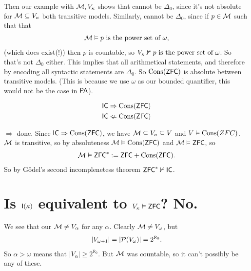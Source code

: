 \documentclass{article}
\begin{document}
Then our example with $\mathcal{M}, V_{\kappa}$ shows that  cannot be $\Delta_{0}$, since it's not absolute for $\mathcal{M} \subseteq V_{\kappa}$ both transitive models. \gap Similarly,  cannot be $\Delta_{0}$, since if $p \in \mathcal{M}$ such that that \[\mathcal{M} \vDash p \text{ is the power set of } \omega,\] (which does exist(!)) then $p$ is countable, so $V_{\kappa} \nvDash p \text{ is the power set of } \omega$. So that's not $\Delta_{0}$ either.  \gap 
This implies that all arithmetical statements, and therefore by encoding all syntactic statements are $\Delta_{0}$. So $\operatorname{Cons}(\mathsf{ZFC})$ is absolute between transitive models. (This is because we use $\omega$ as our bounded quantifier, this would not be the case in $\mathsf{PA}$).
\begin{fancythm}{}
    \begin{align*}
        \mathsf{IC} &\Rightarrow \operatorname{Cons}(\mathsf{ZFC})\\
        \mathsf{IC} &\nLeftarrow \operatorname{Cons}(\mathsf{ZFC})
    \end{align*}
\end{fancythm}
\proof $\Rightarrow$ done. \gap 
Since $\mathsf{IC} \Rightarrow \operatorname{Cons}(\mathsf{ZFC})$, we have $\mathcal{M} \subseteq V_{\kappa} \subseteq V$ and $V \vDash \operatorname{Cons}(ZFC)$. $\mathcal{M}$ is transitive, so by absoluteness $\mathcal{M} \vDash \operatorname{Cons}(\mathsf{ZFC})$ and $\mathcal{M} \vDash \mathsf{ZFC}$, so \[\mathcal{M} \vDash \mathsf{ZFC}^* := \mathsf{ZFC} + \operatorname{Cons}(\mathsf{ZFC}).\]
So by G\"odel's second incomplenetess theorem $\mathsf{ZFC}^{*} \nvdash \mathsf{IC}$. \endproof
\section{Is $\mathsf{I}(\kappa)$ equivalent to $V_{\kappa} \vDash \mathsf{ZFC}$? No.}
We see that our $\mathcal{M} \neq V_{\alpha}$ for any $\alpha$. Clearly $\mathcal{M} \neq V_{\omega}$, but \[|V_{\omega+1}| = |\mathcal{P}(V_{\omega})| = 2^{\aleph_{0}}.\]
So $\alpha > \omega$ means that $|V_{\alpha}| \geq 2^{\aleph_{0
}}$. But $\mathcal{M}$ was countable, so it can't possibly be any of these.

\newlec
\end{document}

